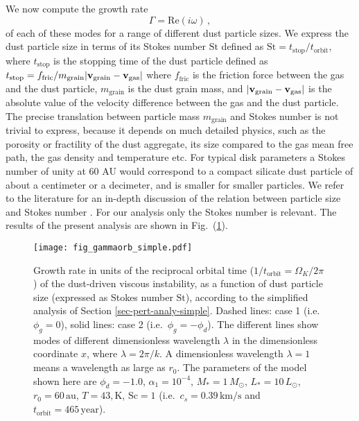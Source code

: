 \documentclass{aa}
\def\comma{\,,}
\begin{document}
We now compute the growth rate
\begin{equation}
\Gamma = \mathrm{Re}(i\omega)\comma
\end{equation}
of each of these modes for a range of different dust particle sizes. We express
the dust particle size in terms of its Stokes number $\mathrm{St}$ defined as
$\mathrm{St}=t_{\mathrm{stop}}/t_{\mathrm{orbit}}$, where $t_{\mathrm{stop}}$ is
the stopping time of the dust particle defined as
$t_{\mathrm{stop}}=f_{\mathrm{fric}}/m_{\mathrm{grain}}|{\bf
  v}_{\mathrm{grain}}-{\bf v}_{\mathrm{gas}}|$ where $f_{\mathrm{fric}}$ is the
friction force between the gas and the dust particle, $m_{\mathrm{grain}}$ is
the dust grain mass, and $|{\bf v}_{\mathrm{grain}}-{\bf v}_{\mathrm{gas}}|$ is
the absolute value of the velocity difference between the gas and the dust
particle. The precise translation between particle mass $m_{\mathrm{grain}}$ and
Stokes number is not trivial to express, because it depends on much detailed
physics, such as the porosity or fractility of the dust aggregate, its size
compared to the gas mean free path, the gas density and temperature etc.  For
typical disk parameters a Stokes number of unity at 60 AU would correspond to a
compact silicate dust particle of about a centimeter or a decimeter, and is
smaller for smaller particles. We refer to the literature for an in-depth
discussion of the relation between particle size and Stokes number \citep[see
  e.g.][]{2010A&A...513A..79B}. For our analysis only the Stokes number is
relevant.  The results of the present analysis are shown in
Fig.~(\ref{fig-gammaorb-simple}).
%
\begin{figure}
  \centerline{\texttt{[image: fig\_gammaorb\_simple.pdf]}}
  \caption{\label{fig-gammaorb-simple}Growth rate in units of the reciprocal
    orbital time ($1/t_{\mathrm{orbit}}=\Omega_K/2\pi$) of the dust-driven
    viscous instability, as a function of dust particle size (expressed as
    Stokes number $\mathrm{St}$), according to the simplified analysis of
    Section \ref{sec-pert-analy-simple}. Dashed lines: case 1 (i.e.~$\phi_g=0$),
    solid lines: case 2 (i.e.~$\phi_g=-\phi_d$). The different lines show modes
    of different dimensionless wavelength $\lambda$ in the dimensionless
    coordinate $x$, where $\lambda=2\pi/k$. A dimensionless wavelength
    $\lambda=1$ means a wavelength as large as $r_0$. The parameters of the
    model shown here are $\phi_d=-1.0$, $\alpha_1=10^{-4}$,
    $M_{*}=1\,M_{\odot}$, $L_{*}=10\,L_{\odot}$, $r_0=60\,\mathrm{au}$,
    $T=43,\mathrm{K}$, $\mathrm{Sc}=1$ (i.e.~$c_s=0.39\,\mathrm{km/s}$ and
    $t_{\mathrm{orbit}}=465\,\mathrm{year}$).}
\end{figure}
\end{document}
